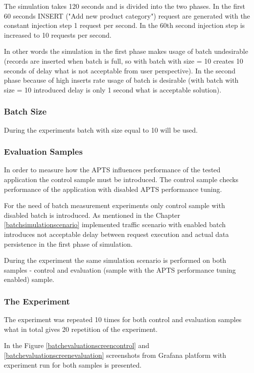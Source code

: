 \documentclass[12pt,a4paper]{article}
\begin{document}
The simulation takes 120 seconds and is divided into the two phases. In the first 60 seconds INSERT ("Add new product category") request are generated with the constant injection step 1 request per second. In the 60th second injection step is increased to 10 requests per second. 

In other words the simulation in the first phase makes usage of batch undesirable (records are inserted when batch is full, so with batch with size = 10 creates 10 seconds of delay what is not acceptable from user perspective). In the second phase because of high inserts rate usage of batch is desirable (with batch with size = 10 introduced delay is only 1 second what is acceptable solution).  
 
\subsubsection{Batch Size} 
During the experiments batch with size equal to 10 will be used. 


\subsubsection{Evaluation Samples} 

In order to measure how the APTS influences performance of the tested application the control sample must be introduced. The control sample checks performance of the application with disabled APTS performance tuning. 

For the need of batch measurement experiments only control sample with disabled batch is introduced. As mentioned in the Chapter \ref{batchsimulationscenario} implemented traffic scenario with enabled batch introduces not acceptable delay between request execution and actual data persistence in the first phase of simulation. 

During the experiment the same simulation scenario is performed on both samples - control and evaluation (sample with the APTS performance tuning enabled) sample.

\subsubsection{The Experiment} 

The experiment was repeated 10 times for both control and evaluation samples what in total gives 20 repetition of the experiment. 

In the Figure \ref{batchevaluationscreencontrol} and \ref{batchevaluationscreenevaluation} screenshots from Grafana platform with experiment run for both samples is presented. 
\end{document}
